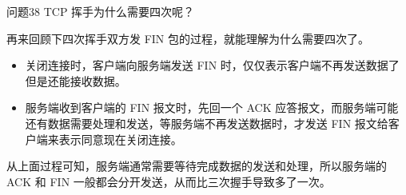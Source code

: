 \documentclass[cn,11pt,color=blue,lang=cn]{elegantbook}
\begin{document}
\begin{custom}{问题38}
TCP 挥手为什么需要四次呢？
\end{custom}
\begin{solution}
再来回顾下四次挥手双方发 FIN 包的过程，就能理解为什么需要四次了。

\begin{itemize}
	\item 关闭连接时，客户端向服务端发送 FIN 时，仅仅表示客户端不再发送数据了但是还能接收数据。
	\item 服务端收到客户端的 FIN 报文时，先回一个 ACK 应答报文，而服务端可能还有数据需要处理和发送，等服务端不再发送数据时，才发送 FIN 报文给客户端来表示同意现在关闭连接。
\end{itemize}
从上面过程可知，服务端通常需要等待完成数据的发送和处理，所以服务端的 ACK 和 FIN 一般都会分开发送，从而比三次握手导致多了一次。
\end{solution}
\end{document}
